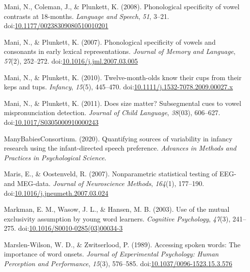 \documentclass[
  man, noextraspace]{apa6}
\begin{document}
\leavevmode\hypertarget{ref-Mani2008}{}%
Mani, N., Coleman, J., \& Plunkett, K. (2008). Phonological specificity of vowel contrasts at 18-months. \emph{Language and Speech}, \emph{51}, 3--21. doi:\href{https://doi.org/10.1177/00238309080510010201}{10.1177/00238309080510010201}

\leavevmode\hypertarget{ref-Mani2007}{}%
Mani, N., \& Plunkett, K. (2007). Phonological specificity of vowels and consonants in early lexical representations. \emph{Journal of Memory and Language}, \emph{57}(2), 252--272. doi:\href{https://doi.org/10.1016/j.jml.2007.03.005}{10.1016/j.jml.2007.03.005}

\leavevmode\hypertarget{ref-Mani2010kepstups}{}%
Mani, N., \& Plunkett, K. (2010). Twelve-month-olds know their cups from their keps and tups. \emph{Infancy}, \emph{15}(5), 445--470. doi:\href{https://doi.org/10.1111/j.1532-7078.2009.00027.x}{10.1111/j.1532-7078.2009.00027.x}

\leavevmode\hypertarget{ref-Mani2011}{}%
Mani, N., \& Plunkett, K. (2011). Does size matter? Subsegmental cues to vowel mispronunciation detection. \emph{Journal of Child Language}, \emph{38}(03), 606--627. doi:\href{https://doi.org/10.1017/S0305000910000243}{10.1017/S0305000910000243}

\leavevmode\hypertarget{ref-MB1}{}%
ManyBabiesConsortium. (2020). Quantifying sources of variability in infancy research using the infant-directed speech preference. \emph{Advances in Methods and Practices in Psychological Science}.

\leavevmode\hypertarget{ref-Maris2007}{}%
Maris, E., \& Oostenveld, R. (2007). Nonparametric statistical testing of EEG- and MEG-data. \emph{Journal of Neuroscience Methods}, \emph{164}(1), 177--190. doi:\href{https://doi.org/10.1016/j.jneumeth.2007.03.024}{10.1016/j.jneumeth.2007.03.024}

\leavevmode\hypertarget{ref-Markman2003}{}%
Markman, E. M., Wasow, J. L., \& Hansen, M. B. (2003). Use of the mutual exclusivity assumption by young word learners. \emph{Cognitive Psychology}, \emph{47}(3), 241--275. doi:\href{https://doi.org/10.1016/S0010-0285(03)00034-3}{10.1016/S0010-0285(03)00034-3}

\leavevmode\hypertarget{ref-Marslen-Wilson1989}{}%
Marslen-Wilson, W. D., \& Zwitserlood, P. (1989). Accessing spoken words: The importance of word onsets. \emph{Journal of Experimental Psychology: Human Perception and Performance}, \emph{15}(3), 576--585. doi:\href{https://doi.org/10.1037/0096-1523.15.3.576}{10.1037/0096-1523.15.3.576}
\end{document}
